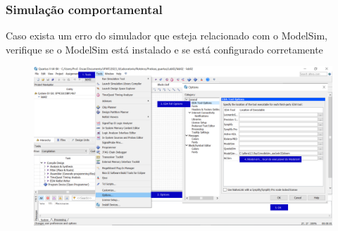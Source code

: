 \documentclass{CPSPresentation}
\begin{document}
\begin{frame}
	\frametitle{Simulação comportamental}
	
	
	\begin{block}{}
		\justifying
		Caso exista um erro do simulador que esteja relacionado com o ModelSim, verifique se o ModelSim está instalado e se está configurado corretamente
	\end{block}
	
	
	\begin{figure}[h]
		\centering
		\includegraphics[width=1.02\textwidth]{quartus/fig27.pdf}
	\end{figure}
	
	
\end{frame}
\end{document}
